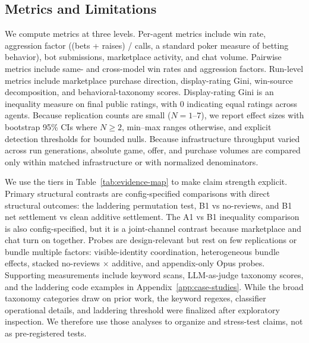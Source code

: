 \documentclass{article}
\begin{document}
\subsection{Metrics and Limitations}
\label{sec:limitations}

We compute metrics at three levels.
Per-agent metrics include win rate, aggression factor ((bets + raises) / calls, a standard poker measure of betting behavior), bot submissions, marketplace activity, and chat volume.
Pairwise metrics include same- and cross-model win rates and aggression factors.
Run-level metrics include marketplace purchase direction, display-rating Gini, win-source decomposition, and behavioral-taxonomy scores.
Display-rating Gini is an inequality measure on final public ratings, with 0 indicating equal ratings across agents.
Because replication counts are small ($N{=}1$--$7$), we report effect sizes with bootstrap 95\% CIs where $N \geq 2$, min--max ranges otherwise, and explicit detection thresholds for bounded nulls.
Because infrastructure throughput varied across run generations, absolute game, offer, and purchase volumes are compared only within matched infrastructure or with normalized denominators.

We use the tiers in Table~\ref{tab:evidence-map} to make claim strength explicit.
Primary structural contrasts are config-specified comparisons with direct structural outcomes: the laddering permutation test, B1 vs no-reviews, and B1 net settlement vs clean additive settlement.
The A1 vs B1 inequality comparison is also config-specified, but it is a joint-channel contrast because marketplace and chat turn on together.
Probes are design-relevant but rest on few replications or bundle multiple factors: visible-identity coordination, heterogeneous bundle effects, stacked no-reviews $\times$ additive, and appendix-only Opus probes.
Supporting measurements include keyword scans, LLM-as-judge taxonomy scores, and the laddering code examples in Appendix~\ref{app:case-studies}.
While the broad taxonomy categories draw on prior work, the keyword regexes, classifier operational details, and laddering threshold were finalized after exploratory inspection.
We therefore use those analyses to organize and stress-test claims, not as pre-registered tests.
\end{document}
